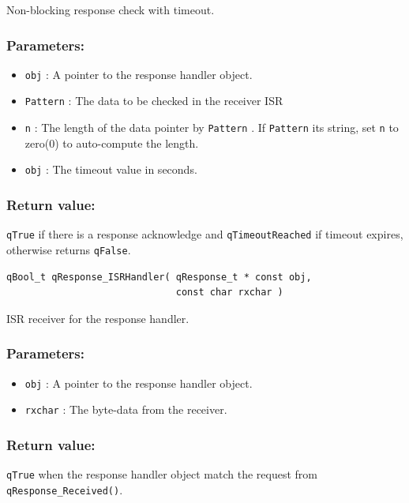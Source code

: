 \documentclass{article}
\begin{document}
Non-blocking response check with timeout. 

\subsubsection*{Parameters:}
\begin{itemize}
    \item \lstinline{obj} : A pointer to the response handler object.
    \item \lstinline{Pattern} : The data to be checked in the receiver ISR
    \item \lstinline{n} : The length of the data pointer by \lstinline{Pattern} . If \lstinline{Pattern} its string, set \lstinline{n} to zero(0) to auto-compute the length.
    \item \lstinline{obj} : The timeout value in seconds.
\end{itemize}

\subsubsection*{Return value:}
\lstinline{qTrue} if there is a response acknowledge and \lstinline{qTimeoutReached} if timeout expires,  otherwise returns \lstinline{qFalse}.

\noindent\hrulefill

\begin{lstlisting}[style=CStyle]
qBool_t qResponse_ISRHandler( qResponse_t * const obj, 
                              const char rxchar )
\end{lstlisting}

ISR receiver for the response handler. 

\subsubsection*{Parameters:}
\begin{itemize}
    \item \lstinline{obj} : A pointer to the response handler object.
    \item \lstinline{rxchar} : The byte-data from the receiver.
\end{itemize}

\subsubsection*{Return value:}
\lstinline{qTrue} when the response handler object match the request from \lstinline{qResponse_Received()}.
\end{document}
